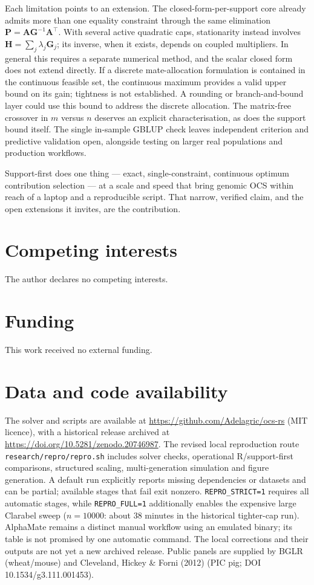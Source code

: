 \documentclass[11pt]{article}
\newcommand{\tp}{^{\top}}
\newcommand{\bG}{\mathbf{G}}
\newcommand{\bA}{\mathbf{A}}
\begin{document}
Each limitation points to an extension. The closed-form-per-support core already admits more than one equality constraint through the same elimination $\mathbf{P}=\bA\bG^{-1}\bA\tp$. With several active quadratic caps, stationarity instead involves $\mathbf{H}=\sum_j\lambda_j\bG_j$; its inverse, when it exists, depends on coupled multipliers. In general this requires a separate numerical method, and the scalar closed form does not extend directly. If a discrete mate-allocation formulation is contained in the continuous feasible set, the continuous maximum provides a valid upper bound on its gain; tightness is not established. A rounding or branch-and-bound layer could use this bound to address the discrete allocation. The matrix-free crossover in $m$ versus $n$ deserves an explicit characterisation, as does the support bound itself. The single in-sample GBLUP check leaves independent criterion and predictive validation open, alongside testing on larger real populations and production workflows.

Support-first does one thing --- exact, single-constraint, continuous optimum contribution selection --- at a scale and speed that bring genomic OCS within reach of a laptop and a reproducible script. That narrow, verified claim, and the open extensions it invites, are the contribution.

\section*{Competing interests}
The author declares no competing interests.

\section*{Funding}
This work received no external funding.

\section*{Data and code availability}

The solver and scripts are available at \url{https://github.com/Adelagric/ocs-rs} (MIT licence), with a historical release archived at \url{https://doi.org/10.5281/zenodo.20746987}. The revised local reproduction route \texttt{research/repro/repro.sh} includes solver checks, operational R/support-first comparisons, structured scaling, multi-generation simulation and figure generation. A default run explicitly reports missing dependencies or datasets and can be partial; available stages that fail exit nonzero. \texttt{REPRO\_STRICT=1} requires all automatic stages, while \texttt{REPRO\_FULL=1} additionally enables the expensive large Clarabel sweep ($n=10000$: about 38 minutes in the historical tighter-cap run). AlphaMate remains a distinct manual workflow using an emulated binary; its table is not promised by one automatic command. The local corrections and their outputs are not yet a new archived release. Public panels are supplied by BGLR (wheat/mouse) and Cleveland, Hickey \& Forni (2012) (PIC pig; DOI 10.1534/g3.111.001453).
\end{document}
